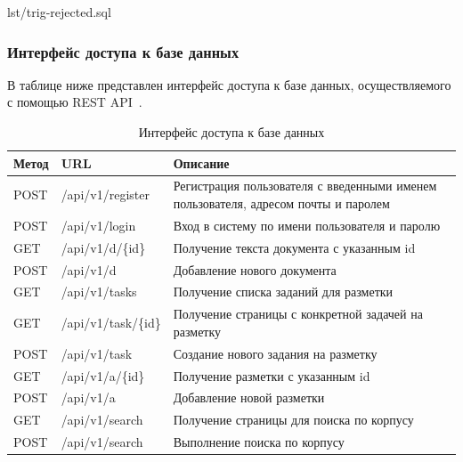 \begin{code}
    \begin{lstinputlisting}[
            label={lst:test:trig:rejected},
            caption={Уменьшение уровня доверия пользователя при отклонении его разметки},
        ]{lst/trig-rejected.sql}
    \end{lstinputlisting}
\end{code}

\subsubsection{Интерфейс доступа к базе данных}

В таблице ниже представлен интерфейс доступа к базе данных, осуществляемого с помощью REST API~\cite{restapi}.

\begin{table}[H]
\centering
\caption{Интерфейс доступа к базе данных}
\begin{tabular}{|m{2cm}|m{4cm}|m{9cm}|}
\hline
    \textbf{Метод} & \textbf{URL} & \textbf{Описание} \\ \hline
    POST & /api/v1/register & Регистрация пользователя с введенными именем пользователя, адресом почты и паролем \\ \hline
    POST & /api/v1/login & Вход в систему по имени пользователя и паролю \\ \hline
    GET & /api/v1/d/\{id\} & Получение текста документа с указанным id \\ \hline
    POST & /api/v1/d & Добавление нового документа \\ \hline
    GET & /api/v1/tasks & Получение списка заданий для разметки \\ \hline
    GET & /api/v1/task/\{id\} & Получение страницы с конкретной задачей на разметку \\ \hline
    POST & /api/v1/task & Создание нового задания на разметку \\ \hline
    GET & /api/v1/a/\{id\} & Получение разметки с указанным id \\ \hline
    POST & /api/v1/a & Добавление новой разметки \\ \hline
    GET & /api/v1/search & Получение страницы для поиска по корпусу \\ \hline
    POST & /api/v1/search & Выполнение поиска по корпусу \\ \hline
\end{tabular}
\label{tab:api}
\end{table}

